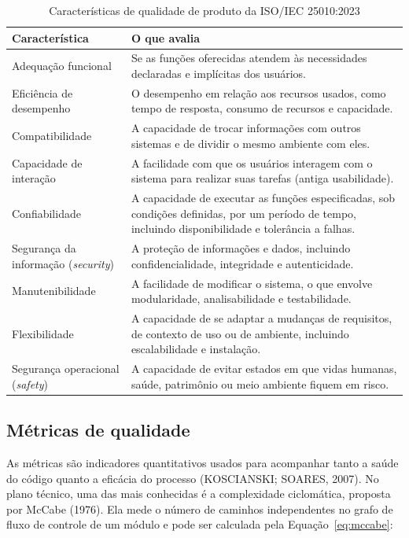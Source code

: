 \documentclass[12pt,a4paper]{article}
\newcommand{\fonte}[1]{\vspace{0.2cm}{\small Fonte: #1}}
\begin{document}
\begin{table}[htbp]
\centering
\caption{Características de qualidade de produto da ISO/IEC 25010:2023}
\label{quadro:iso}
\begin{tabularx}{\textwidth}{>{\raggedright\arraybackslash}p{4.2cm} X}
\toprule
\textbf{Característica} & \textbf{O que avalia} \\
\midrule
Adequação funcional & Se as funções oferecidas atendem às necessidades declaradas e implícitas dos usuários. \\
\addlinespace
Eficiência de desempenho & O desempenho em relação aos recursos usados, como tempo de resposta, consumo de recursos e capacidade. \\
\addlinespace
Compatibilidade & A capacidade de trocar informações com outros sistemas e de dividir o mesmo ambiente com eles. \\
\addlinespace
Capacidade de interação & A facilidade com que os usuários interagem com o sistema para realizar suas tarefas (antiga usabilidade). \\
\addlinespace
Confiabilidade & A capacidade de executar as funções especificadas, sob condições definidas, por um período de tempo, incluindo disponibilidade e tolerância a falhas. \\
\addlinespace
Segurança da informação (\textit{security}) & A proteção de informações e dados, incluindo confidencialidade, integridade e autenticidade. \\
\addlinespace
Manutenibilidade & A facilidade de modificar o sistema, o que envolve modularidade, analisabilidade e testabilidade. \\
\addlinespace
Flexibilidade & A capacidade de se adaptar a mudanças de requisitos, de contexto de uso ou de ambiente, incluindo escalabilidade e instalação. \\
\addlinespace
Segurança operacional (\textit{safety}) & A capacidade de evitar estados em que vidas humanas, saúde, patrimônio ou meio ambiente fiquem em risco. \\
\bottomrule
\end{tabularx}

\fonte{adaptado de ISO/IEC (2023).}
\end{table}

\subsection{Métricas de qualidade}
\label{sec:metricas}

As métricas são indicadores quantitativos usados para acompanhar tanto a saúde do código quanto a eficácia do processo (KOSCIANSKI; SOARES, 2007). No plano técnico, uma das mais conhecidas é a complexidade ciclomática, proposta por McCabe (1976). Ela mede o número de caminhos independentes no grafo de fluxo de controle de um módulo e pode ser calculada pela Equação~\eqref{eq:mccabe}:
\end{document}
